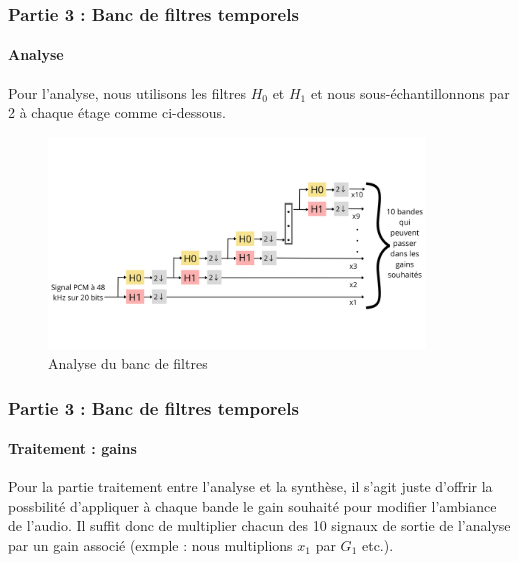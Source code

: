 \documentclass[
10pt,
aspectratio=169,
]{beamer}
\begin{document}
\begin{frame}
\frametitle{Partie 3 : Banc de filtres temporels} 
\framesubtitle{Analyse}
Pour l'analyse, nous utilisons les filtres $H_0$ et $H_1$ et nous sous-échantillonnons par 2 à chaque étage comme ci-dessous.
\begin{figure}
 \centering
\includegraphics[width=10cm]{Images/analyse.png}
 \caption{Analyse du banc de filtres}
\end{figure}
\end{frame}



%
%
%

%

\begin{frame}
\frametitle{Partie 3 : Banc de filtres temporels} 
\framesubtitle{Traitement : gains}
Pour la partie traitement entre l'analyse et la synthèse, il s'agit juste d'offrir la possbilité d'appliquer à chaque bande le gain souhaité pour modifier l'ambiance de l'audio. Il suffit donc de multiplier chacun des 10 signaux de sortie de l'analyse par un gain associé (exmple : nous multiplions $x_1$ par $G_1$ etc.).
\end{frame}
\end{document}
